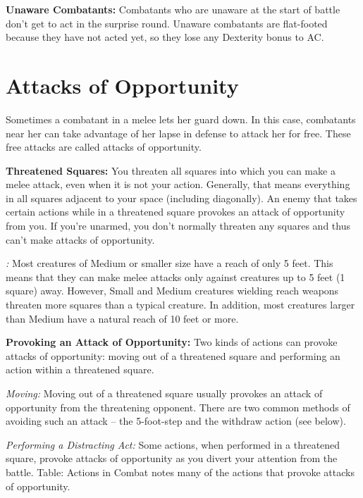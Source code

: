 \textbf{Unaware Combatants:} Combatants who are unaware at the start of battle don't get to act in the surprise round. Unaware combatants are flat-footed because they have not acted yet, so they lose any Dexterity bonus to AC.

\section{Attacks of Opportunity}

Sometimes a combatant in a melee lets her guard down. In this case, combatants near her can take advantage of her lapse in defense to attack her for free. These free attacks are called attacks of opportunity.

\textbf{Threatened Squares:} You threaten all squares into which you can make a melee attack, even when it is not your action. Generally, that means everything in all squares adjacent to your space (including diagonally). An enemy that takes certain actions while in a threatened square provokes an attack of opportunity from you. If you're unarmed, you don't normally threaten any squares and thus can't make attacks of opportunity.

\textit{:} Most creatures of Medium or smaller size have a reach of only 5 feet. This means that they can make melee attacks only against creatures up to 5 feet (1 square) away. However, Small and Medium creatures wielding reach weapons threaten more squares than a typical creature. In addition, most creatures larger than Medium have a natural reach of 10 feet or more.

\textbf{Provoking an Attack of Opportunity:} Two kinds of actions can provoke attacks of opportunity: moving out of a threatened square and performing an action within a threatened square.

\textit{Moving:} Moving out of a threatened square usually provokes an attack of opportunity from the threatening opponent. There are two common methods of avoiding such an attack -- the 5-foot-step and the withdraw action (see below).

\textit{Performing a Distracting Act:} Some actions, when performed in a threatened square, provoke attacks of opportunity as you divert your attention from the battle. Table: Actions in Combat notes many of the actions that provoke attacks of opportunity.

